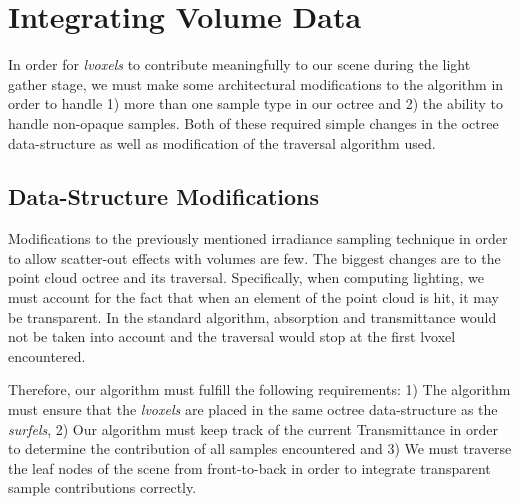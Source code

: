 \documentclass[12pt]{ucthesis}
\begin{document}





\section{Integrating Volume Data}
\label{sec:int_vol}
In order for \textit{lvoxels} to contribute meaningfully to our scene during the light gather stage, we must make some architectural modifications to the algorithm in order to handle 1) more than one sample type in our octree and 2) the ability to handle non-opaque samples.  Both of these required simple changes in the octree data-structure as well as modification of the traversal algorithm used.

\subsection{Data-Structure Modifications}
Modifications to the previously mentioned irradiance sampling technique in order to allow scatter-out effects with volumes are few.  The biggest changes are to the point cloud octree and its traversal.  Specifically, when computing lighting, we must account for the fact that when an element of the point cloud is hit, it may be transparent.  In the standard algorithm, absorption and transmittance would not be taken into account and the traversal would stop at the first lvoxel encountered.

Therefore, our algorithm must fulfill the following requirements: 1) The algorithm must ensure that the \textit{lvoxels} are placed in the same octree data-structure as the \textit{surfels}, 2) Our algorithm must keep track of the current Transmittance in order to determine the contribution of all samples encountered and 3) We must traverse the leaf nodes of the scene from front-to-back in order to integrate transparent sample contributions correctly.
\end{document}
